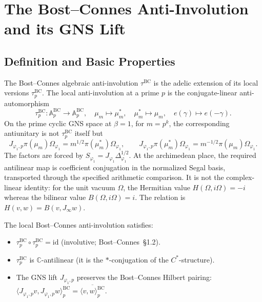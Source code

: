 \section{The Bost--Connes Anti-Involution and its GNS Lift}
\label{v4-arith:kp:BC-involution}

\subsection{Definition and Basic Properties}
\label{v4-arith:kp:BC-involution:def}

The Bost--Connes algebraic anti-involution
\(\tau^{\mathrm{BC}}\) is the adelic extension of its local versions
\(\tau^{\mathrm{BC}}_{p}\). The local anti-involution at a prime \(p\)
is the conjugate-linear anti-automorphism
\begin{equation}
\label{v4-arith:kp:eq:BC-involution-local}
\tau^{\mathrm{BC}}_{p}\colon\mathbb{A}^{\mathrm{BC}}_{p}\to\mathbb{A}^{\mathrm{BC}}_{p},
\quad
\mu_{m}\mapsto\mu_{m}^{*},\quad
\mu_{m}^{*}\mapsto\mu_{m},\quad
e(\gamma)\mapsto e(-\gamma).
\end{equation}
On the prime cyclic GNS space at \(\beta=1\), for \(m=p^k\), the corresponding
antiunitary is not \(\tau^{\mathrm{BC}}_{p}\) itself but
\[
J_{\varphi_{1},p}\pi(\mu_m)\Omega_{\varphi_{1}}
=m^{1/2}\pi(\mu_m^{*})\Omega_{\varphi_{1}},\qquad
J_{\varphi_{1},p}\pi(\mu_m^{*})\Omega_{\varphi_{1}}
=m^{-1/2}\pi(\mu_m)\Omega_{\varphi_{1}} .
\]
The factors are forced by
\(S_{\varphi_{1}}=J_{\varphi_{1}}\Delta_{\varphi_{1}}^{1/2}\). At the
archimedean place, the required antilinear map is coefficient
conjugation in the normalized Segal basis, transported through the
specified arithmetic comparison. It is not the complex-linear identity:
for the unit vacuum \(\Omega\), the Hermitian value
\(H(\Omega,i\Omega)=-i\) whereas the bilinear value
\(B(\Omega,i\Omega)=i\). The relation is
\(H(v,w)=B(v,J_\infty w)\).


\begin{lemma}
\label{v4-arith:kp:lem:involution-properties}
The local Bost--Connes anti-involution
satisfies:
\begin{itemize}
\item \(\tau^{\mathrm{BC}}_{p}\circ\tau^{\mathrm{BC}}_{p}=\mathrm{id}\)
(involutive; Bost--Connes~\S1.2).
\item \(\tau^{\mathrm{BC}}_{p}\) is \(\mathbb{C}\)-antilinear
(it is the \(*\)-conjugation of the \(C^{*}\)-structure).
\item The GNS lift \(J_{\varphi_{1},p}\) preserves the Bost--Connes
Hilbert pairing:
\(\langle J_{\varphi_{1},p}v,J_{\varphi_{1},p}w\rangle^{\mathrm{BC}}_{p}
=\overline{\langle v,w\rangle^{\mathrm{BC}}_{p}}\).
\end{itemize}
\end{lemma}

